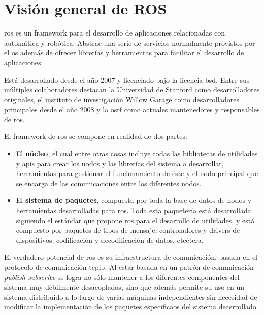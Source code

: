 \chapter{Visión general de ROS}
\label{ch:ros-overview}

\ac{ros} es un \ac{framework} para el desarrollo de aplicaciones relacionadas con automática y robótica. Abstrae una serie de servicios normalmente provistos por el \ac{os} además de ofrecer librerías y herramientas para facilitar el desarrollo de aplicaciones.

Está desarrollado desde el año 2007 y licenciado bajo la licencia \ac{bsd}. Entre sus múltiples colaboradores destacan la Universidad de Stanford como desarrolladores originales, el instituto de investigación Willow Garage como desarrolladores principales desde el año 2008 y la \ac{osrf} como actuales mantenedores y responsables de \ac{ros}. 

El \ac{framework} de \ac{ros} se compone en realidad de dos partes:

\begin{itemize}
	\item El \textbf{núcleo}, el cual entre otras cosas incluye todas las bibliotecas de utilidades y \acp{api} para crear los nodos y las librerías del sistema a desarrollar, herramientas para gestionar el funcionamiento de éste y el nodo principal que se encarga de las comunicaciones entre los diferentes nodos.
	\item El \textbf{sistema de paquetes}, compuesta por toda la base de datos de nodos y herramientas desarrolladas para \ac{ros}. Toda esta paquetería está desarrollada siguiendo el estándar que propone \ac{ros} para el desarrollo de utilidades, y está compuesto por paquetes de tipos de mensaje, controladores y drivers de dispositivos, codificación y decodificación de datos, etcétera.
\end{itemize}

El verdadero potencial de \ac{ros} es su infraestructura de comunicación, basada en el protocolo de comunicación \ac{tcpip}. Al estar basada en un patrón de comunicación \textit{publish-subscribe} se logra no sólo mantener a los diferentes componentes del sistema muy débilmente desacoplados, sino que además permite su uso en un sistema distribuido a lo largo de varias máquinas independientes sin necesidad de modificar la implementación de los paquetes especificaos del sistema deasrrollado.

